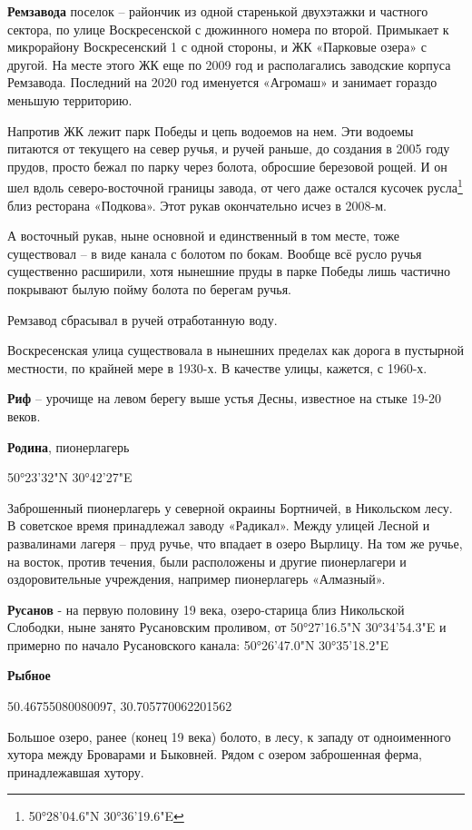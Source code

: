 \medskip

\textbf{Ремзавода} поселок – райончик из одной старенькой двухэтажки и частного сектора, по улице Воскресенской с дюжинного номера по второй. Примыкает к микрорайону Воскресенский 1 с одной стороны, и ЖК «Парковые озера» с другой. На месте этого ЖК еще по 2009 год и располагались заводские корпуса Ремзавода. Последний на 2020 год именуется «Агромаш» и занимает гораздо меньшую территорию.

Напротив ЖК лежит парк Победы и цепь водоемов на нем. Эти водоемы питаются от текущего на север ручья, и ручей раньше, до создания в 2005 году прудов, просто бежал по парку через болота, обросшие березовой рощей. И он шел вдоль северо-восточной границы завода, от чего даже остался кусочек русла\footnote{50°28'04.6"N 30°36'19.6"E} близ ресторана «Подкова». Этот рукав окончательно исчез в 2008-м. 

А восточный рукав, ныне основной и единственный в том месте, тоже существовал – в виде канала с болотом по бокам. Вообще всё русло ручья существенно расширили, хотя нынешние пруды в парке Победы лишь частично покрывают былую пойму болота по берегам ручья.

Ремзавод сбрасывал в ручей отработанную воду.

Воскресенская улица существовала в нынешних пределах как дорога в пустырной местности, по крайней мере в 1930-х. В качестве улицы, кажется,  с 1960-х.\\

\medskip

\textbf{Риф} – урочище на левом берегу выше устья Десны, известное на стыке 19-20 веков.\\

\medskip

\textbf{Родина}, пионерлагерь

50°23'32"N 30°42'27"E

Заброшенный пионерлагерь у северной окраины Бортничей, в Никольском лесу. В советское время принадлежал заводу «Радикал». Между улицей Лесной и развалинами лагеря – пруд ручье, что впадает в озеро Вырлицу. На том же ручье, на восток, против течения, были расположены и другие пионерлагери и оздоровительные учреждения, например пионерлагерь «Алмазный».\\

\medskip


\textbf{Русанов} - на первую половину 19 века, озеро-старица близ Никольской Слободки, ныне занято Русановским проливом, от 50°27'16.5"N 30°34'54.3"E и примерно по начало Русановского канала: 50°26'47.0"N 30°35'18.2"E\\

\medskip


\textbf{Рыбное} 

50.46755080080097, 30.705770062201562

Большое озеро, ранее (конец 19 века) болото, в лесу, к западу от одноименного хутора между Броварами и Быковней. Рядом с озером заброшенная ферма, принадлежавшая хутору.
